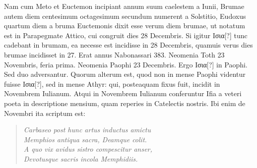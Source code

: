 Nam cum
Meto et Euctemon incipiant annum suum caelestem a  Iunii,
Brumae autem diem centesimum octagesimum secundum numerent
a Solstitio, Eudoxus quartum diem a bruma Euctemonis dixit esse verum
diem brumae, ut notatum est in Parapegmate Attico, cui congruit
dies 28 Decembris.
Si igitur \textgreek{Ισια[?]} tunc cadebant in brumam, ea necesse
est incidisse in 28 Decembris, quamuis verus dies brumae incidisset
in 27.
Erat annus Nabonassari 383.
Neomenia Toth 23 Novembris,
feria prima.
Neomenia Paophi 23 Decembris.
Ergo \textgreek{Ισια[?]} in 
Paophi.
Sed duo adversantur.
Quorum alterum est, quod non in mense
Paophi videntur fuisse \textgreek{Ισια[?]}, sed in mense Athyr: qui, posteaquam
fixus fuit, incidit in Novembrem Iulianum.
Atqui in Novembrem
Iulianum conferuntur Ifia a veteri poeta in descriptione mensium, quam
reperies in Catelectis nostris.
Ibi enim de Novembri ita scriptum est:
\begin{quote}
\emph{Carbaseo post hunc artus inductus amictu}\\
\emph{\hspace*{1em}Memphios antiqua sacra, Deamque colit.}\\
\emph{A quo vix avidus sistro compescitur anser,}\\
\emph{\hspace*{1em}Devotusque sacris incola Memphidiis.}
\end{quote}

